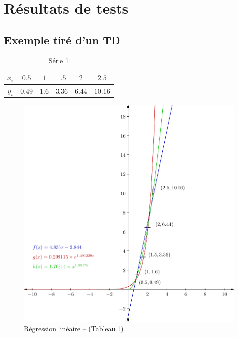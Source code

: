 \documentclass{report}
\begin{document}
    \section{Résultats de tests}
      \subsection{Exemple tiré d'un TD}
	\begin{table}[h]
	  \centering
	  \begin{tabular}{| c | c | c | c | c | c |}
	    \hline 
	    $x_{i}$ & $0.5$ & $1$ & $1.5$ & $2$ & $2.5$ \\ 
	    \hline 
	    $y_{i}$ & $0.49$ & $1.6$ & $3.36$ & $6.44$ & $10.16$ \\ 
	    \hline 
	  \end{tabular}
	  \caption{Série 1}
	  \label{approx_td3_ex6}
	\end{table}
	\begin{figure}[h]
	  \centering
	  \includegraphics{graphiques/pdf_output/reglin.pdf}
	  \caption{Régression linéaire -- (Tableau \ref{approx_td3_ex6})}
	\end{figure}
      \newpage
\end{document}
